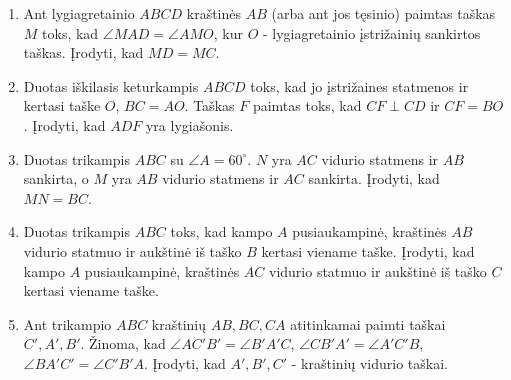 \begin{enumerate}
  \item Ant lygiagretainio $ABCD$ kraštinės $AB$ (arba ant jos tęsinio)
    paimtas taškas $M$ toks, kad $\angle MAD = \angle AMO$, kur $O$ -
    lygiagretainio įstrižainių sankirtos taškas. Įrodyti, kad $MD=MC$. 
  \item Duotas iškilasis keturkampis $ABCD$ toks, kad  jo įstrižaines
    statmenos ir kertasi taške $O$, $BC = AO$.  Taškas $F$ paimtas toks, kad
    $CF \perp{CD}$ ir $CF = BO$.  Įrodyti, kad $ADF$ yra lygiašonis. 
  \item Duotas trikampis $ABC$ su $\angle A = 60^\circ$. $N$ yra $AC$ vidurio
    statmens ir $AB$ sankirta, o $M$ yra $AB$ vidurio statmens ir $AC$
    sankirta. Įrodyti, kad $MN = BC$.
  \item Duotas trikampis $ABC$ toks, kad kampo $A$ pusiaukampinė, kraštinės
    $AB$ vidurio statmuo ir aukštinė iš taško $B$ kertasi viename taške.
    Įrodyti, kad kampo $A$ pusiaukampinė, kraštinės $AC$ vidurio statmuo ir
    aukštinė iš taško $C$ kertasi viename taške.
  \item Ant trikampio $ABC$ kraštinių $AB, BC, CA$ atitinkamai paimti taškai
    $C', A', B'$. Žinoma, kad $\angle AC'B' = \angle B'A'C$, $\angle CB'A' =
    \angle A'C'B$, $\angle BA'C' = \angle C'B'A$. Įrodyti, kad $A', B', C'$ -
    kraštinių vidurio taškai.

\end{enumerate}
